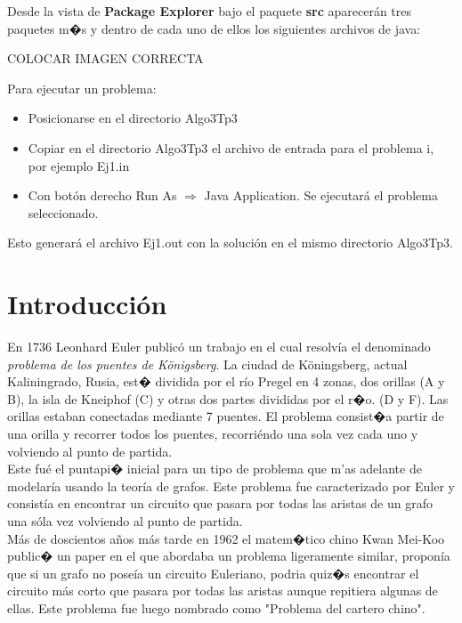 \documentclass[11pt, a4paper, spanish]{article}
\begin{document}
	Desde la vista de \textbf{Package Explorer} bajo el paquete \textbf{src} aparecer\'an tres paquetes m�s y dentro de cada uno de ellos los siguientes archivos de java:\\

	\begin{center}
		COLOCAR IMAGEN CORRECTA
	\end{center}

\newpage

	Para ejecutar un problema:

	\begin{itemize}
			\item{Posicionarse en el directorio Algo3Tp3}
			\item{Copiar en el directorio Algo3Tp3 el archivo de entrada para el problema i, por ejemplo Ej1.in}
			\item{Con bot\'on derecho Run As $\Rightarrow$ Java Application. Se ejecutar\'a el problema seleccionado.}
	\end{itemize}
	Esto generar\'a el archivo Ej1.out con la soluci\'on en el mismo directorio Algo3Tp3.

\newpage


\section{Introducci\'on}

	En 1736 Leonhard Euler public\'o un trabajo en el cual resolv\'ia el denominado \emph{problema de los puentes de K\"{o}nigsberg}. La ciudad de K\"{o}ningsberg, actual Kaliningrado, Rusia, est� dividida por el r\'io Pregel en 4 zonas, dos orillas (A y B), la isla de Kneiphof (C) y otras dos partes divididas por el r�o. (D y F). Las orillas estaban conectadas mediante 7 puentes. El problema consist�a partir de una orilla y recorrer todos los puentes, recorri\'endo una sola vez cada uno y volviendo al punto de partida.\\

Este fu\'e el puntapi� inicial para un tipo de problema que m'as adelante de modelar\'ia usando la teor\'ia de grafos. Este problema fue caracterizado por Euler y consist\'ia en encontrar un circuito que pasara por todas las aristas de un grafo una s\'ola vez volviendo al punto de partida.\\
 
M\'as de doscientos a\~{n}os m\'as tarde en 1962 el matem�tico chino Kwan Mei-Koo public� un paper en el que abordaba un problema ligeramente similar, propon\'ia que si un grafo no pose\'ia un circuito Euleriano, podria quiz�s encontrar el circuito m\'as corto que pasara por todas las aristas aunque repitiera algunas de ellas. Este problema fue luego nombrado como "Problema del cartero chino".
\end{document}
